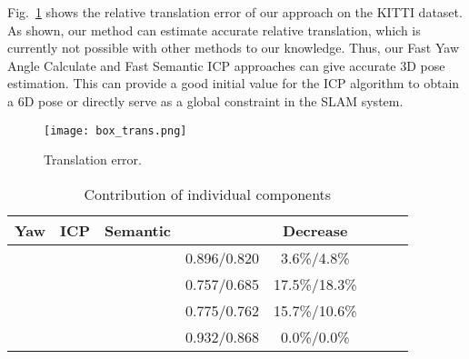 \documentclass[letterpaper, 10 pt, conference]{ieeeconf}
\begin{document}
Fig.~\ref{pic:trans} shows the relative translation error of our approach on the KITTI dataset. As shown, our method can estimate accurate relative translation, which is currently not possible with other methods to our knowledge. Thus, our Fast Yaw Angle Calculate and Fast Semantic ICP approaches can give accurate 3D pose estimation. This can provide a good initial value for the ICP algorithm to obtain a 6D pose or directly serve as a global constraint in the SLAM system. 








    \begin{figure}[t]
        \centering
\texttt{[image: box\_trans.png]}
\caption{Translation error.}
        \label{pic:trans}
     \end{figure}
     
\begin{table}[t]\footnotesize
    \caption{\centering Contribution of individual components}\vspace{-3mm}
    \label{table:Ablation}
    \begin{center}
\begin{tabular}{c c c c c c c c}
    \hline
    Yaw & ICP & Semantic & &Decrease\\ 
    \hline
    ~&&&0.896/0.820&3.6\%/4.8\%\\
    &~&&0.757/0.685&17.5\%/18.3\%\\
    &&~&0.775/0.762&15.7\%/10.6\%\\
    &&&0.932/0.868&0.0\%/0.0\%\\
    \hline
    \end{tabular}
\end{center}
    \end{table}
\end{document}
